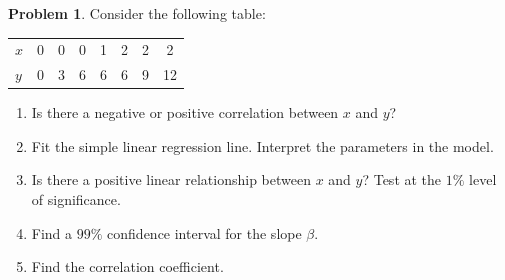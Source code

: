 \documentclass[11pt,a4paper]{article}
\theoremstyle{definition}
\newtheorem{problemx}{Problem}[section]
\newenvironment{problem}{\begin{problemx}}{\end{problemx}}
\begin{document}
\begin{problem}
Consider the following table:
\begin{table}[H]
\centering
\begin{tabular}{l|ccccccc}
$x$ & 0 & 0 & 0 & 1 & 2 & 2 & 2\\
$y$ & 0 & 3 & 6 & 6 & 6 & 9 & 12\\
\end{tabular}
\end{table}
\begin{enumerate}
\item[(a).] Is there a negative or positive correlation between $x$ and $y$?
\item[(b).] Fit the simple linear regression line. Interpret the parameters in the model.
\item[(c).] Is there a positive linear relationship between $x$ and $y$? Test at the $1\%$
level of significance.
\item[(d).] Find a $99\%$ confidence interval for the slope $\beta$.
\item[(e).] Find the correlation coefficient.
\end{enumerate}
\end{problem}
\end{document}
